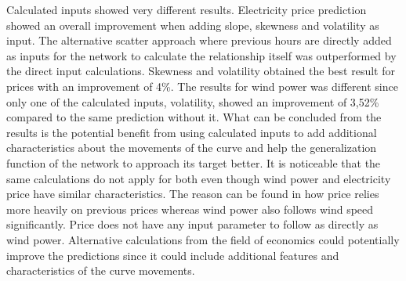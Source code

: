 Calculated inputs showed very different results. Electricity price prediction showed an overall improvement when adding slope, skewness and volatility as input. The alternative scatter approach where previous hours are directly added as inputs for the network to calculate the relationship itself was outperformed by the direct input calculations. Skewness and volatility obtained the best result for prices with an improvement of 4\%. The results for wind power was different since only one of the calculated inputs, volatility, showed an improvement of 3,52\% compared to the same prediction without it. What can be concluded from the results is the potential benefit from using calculated inputs to add additional characteristics about the movements of the curve and help the generalization function of the network to approach its target better. It is noticeable that the same calculations do not apply for both even though wind power and electricity price have similar characteristics. The reason can be found in how price relies more heavily on previous prices whereas wind power also follows wind speed significantly. Price does not have any input parameter to follow as directly as wind power. Alternative calculations from the field of economics could potentially improve the predictions since it could include additional features and characteristics of the curve movements.